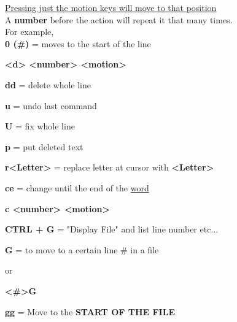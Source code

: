 \documentclass[12pt, letterpaper]{article}
\begin{document}
\begin{flushleft}
\underline{Pressing just the motion keys will move to that position} \\

A \textbf{number} before the action will repeat it that many times. \\

For example, \\

\textbf{0 (\#)} = moves to the start of the line \\
\par

\textbf{<d> <number> <motion>} \\
\par

\textbf{dd} = delete whole line \\
\par

\textbf{u} = undo last command \\
\par

\textbf{U} = fix whole line \\
\par

\textbf{p} = put deleted text \\
\par

\textbf{r<Letter>} = replace letter at cursor with \textbf{<Letter>} \\
\par

\textbf{ce} = change until the end of the \underline{word} \\
\par

\textbf{c <number> <motion> } \\
\par

\textbf{CTRL + G} = "Display File" and list line number etc... \\
\par

\textbf{G} = to move to a certain line \# in a file \\
\par
or \\
\par
\textbf{<\#>G} \\
\par

\textbf{gg} = Move to the \textbf{START OF THE FILE} \\
\par


\end{flushleft}
\end{document}
